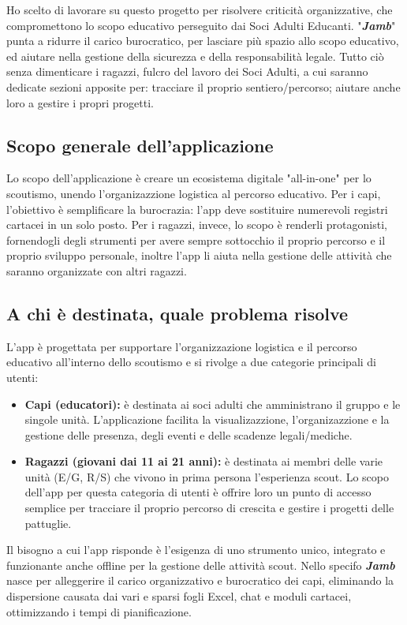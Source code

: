\documentclass[11pt]{article}
\begin{document}
Ho scelto di lavorare su questo progetto  per risolvere criticità organizzative, che compromettono lo scopo educativo perseguito dai Soci Adulti Educanti. "\textbf{\textit{Jamb}}" punta a ridurre il carico burocratico, per lasciare più spazio allo scopo educativo, ed aiutare nella gestione della sicurezza e della responsabilità legale. Tutto ciò senza dimenticare i ragazzi, fulcro del lavoro dei Soci Adulti, a cui saranno dedicate sezioni apposite per: tracciare il proprio sentiero/percorso; aiutare anche loro a gestire i propri progetti.


\subsection{Scopo generale dell'applicazione}
Lo scopo dell'applicazione è creare un ecosistema digitale "all-in-one" per lo scoutismo, unendo l'organizazzione logistica al percorso educativo. Per i capi, l'obiettivo è semplificare la burocrazia: l'app deve sostituire numerevoli registri cartacei in un solo posto. Per i ragazzi, invece, lo scopo è renderli protagonisti, fornendogli degli strumenti per avere sempre sottocchio il proprio percorso e il proprio sviluppo personale, inoltre l'app li aiuta nella gestione delle attività che saranno organizzate con altri ragazzi.

\subsection{A chi è destinata, quale problema risolve}
L'app è progettata per supportare l'organizzazione logistica e il percorso educativo all'interno dello scoutismo e si rivolge a due categorie principali di utenti:
\begin{itemize}[topsep=0.5pt]
  \item \textbf{Capi (educatori):} è destinata ai soci adulti che amministrano il gruppo e le singole unità. L'applicazione facilita la visualizazzione, l'organizazzione e la gestione delle presenza, degli eventi e delle scadenze legali/mediche.
  \item \textbf{Ragazzi (giovani dai 11 ai 21 anni):} è destinata ai membri delle varie unità (E/G, R/S) che vivono in prima persona l'esperienza scout. Lo scopo dell'app per questa categoria di utenti è offrire loro un punto di accesso semplice per tracciare il proprio percorso di crescita e gestire i progetti delle pattuglie.
\end{itemize}

Il bisogno a cui l'app risponde è l'esigenza di uno strumento unico, integrato e funzionante anche offline per la gestione delle attività scout. Nello specifo \textit{\textbf{Jamb}} nasce per alleggerire il carico organizzativo e burocratico dei capi, eliminando la dispersione causata dai vari e sparsi fogli Excel, chat e moduli cartacei, ottimizzando i tempi di pianificazione.
\end{document}
